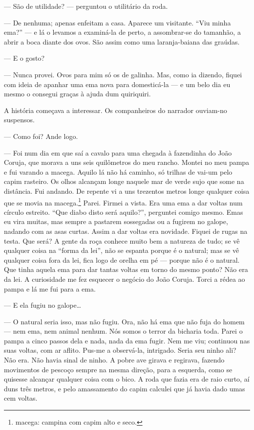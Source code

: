 --- São de utilidade? --- perguntou o utilitário da roda.

--- De nenhuma; apenas enfeitam a casa. Aparece um visitante. ``Viu
minha ema?'' --- e lá o levamos a examiná-la de perto, a assombrar-se do
tamanhão, a abrir a boca diante dos ovos. São assim como uma
laranja-baiana das graúdas.

--- E o gosto?

--- Nunca provei. Ovos para mim só os de galinha. Mas, como ia dizendo,
fiquei com ideia de apanhar uma ema nova para domesticá-la --- e um belo
dia eu mesmo o consegui graças à ajuda dum quiriquiri.

A história começava a interessar. Os companheiros do narrador ouviam-no
suspensos.

--- Como foi? Ande logo.

--- Foi num dia em que saí a cavalo para uma chegada à fazendinha do
João Coruja, que morava a uns seis quilômetros do meu rancho. Montei no
meu pampa e fui varando a macega. Aquilo lá não há caminho, só trilhas
de vai-um pelo capim rasteiro. Os olhos alcançam longe naquele mar de
verde sujo que some na distância. Fui andando. De repente vi a uns
trezentos metros longe qualquer coisa que se movia na macega.\footnote{macega:
  campina com capim alto e seco.} Parei. Firmei a vista. Era uma ema a
dar voltas num círculo estreito. ``Que diabo disto será aquilo?'',
perguntei comigo mesmo. Emas eu vira muitas, mas sempre a pastarem
sossegadas ou a fugirem no galope, nadando com as asas curtas. Assim a
dar voltas era novidade. Fiquei de rugas na testa. Que será? A gente da
roça conhece muito bem a natureza de tudo; se vê qualquer coisa na
``forma da lei'', não se espanta porque é o natural; mas se vê qualquer
coisa fora da lei, fica logo de orelha em pé --- porque não é o natural.
Que tinha aquela ema para dar tantas voltas em torno do mesmo ponto? Não
era da lei. A curiosidade me fez esquecer o negócio do João Coruja.
Torci a rédea ao pampa e lá me fui para a ema.

--- E ela fugiu no galope\ldots{}

--- O natural seria isso, mas não fugiu. Ora, não há ema que não fuja do
homem --- nem ema, nem animal nenhum. Nós somos o terror da bicharia
toda. Parei o pampa a cinco passos dela e nada, nada da ema fugir. Nem
me viu; continuou nas suas voltas, com ar aflito. Pus-me a observá-la,
intrigado. Seria seu ninho ali? Não era. Não havia sinal de ninho. A
pobre ave girava e regirava, fazendo movimentos de pescoço sempre na
mesma direção, para a esquerda, como se quisesse alcançar qualquer coisa
com o bico. A roda que fazia era de raio curto, aí duns três metros, e
pelo amassamento do capim calculei que já havia dado umas cem voltas.

